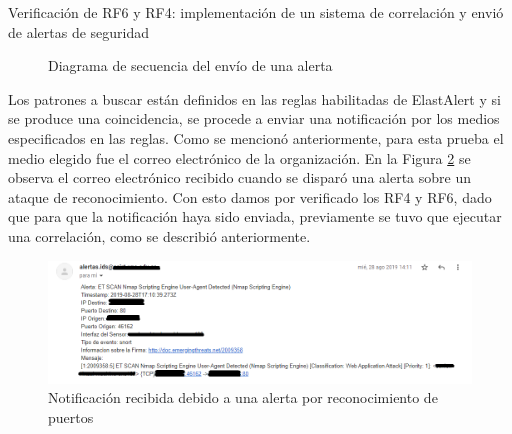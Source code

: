 \begin{section}{Verificación de RF6 y RF4: implementación de un sistema de correlación y envió de alertas de seguridad}
\begin{figure}[H]
        \caption{Diagrama de secuencia del envío de una alerta}
        \label{fig:iter2_diagrama_envio_alertas}
    \end{figure}
    Los patrones a buscar están definidos en las reglas habilitadas de ElastAlert y si se produce una coincidencia, se procede a enviar una notificación por los medios especificados en las reglas. Como se mencionó anteriormente, para esta prueba el medio elegido fue el correo electrónico de la organización. En la Figura \ref{fig:iter2_notificacion_alertas} se observa el correo electrónico recibido cuando se disparó una alerta sobre un ataque de reconocimiento. Con esto damos por verificado los RF4 y RF6, dado que para que la notificación haya sido enviada, previamente se tuvo que ejecutar una correlación, como se describió anteriormente.\par
    \begin{figure}[H]
    \centering
        \includegraphics[width=1\textwidth]{./iteracion_2_imagenes/notificacion_alertas_1EDITADO.png}
        \caption{Notificación recibida debido a una alerta por reconocimiento de puertos}
        \label{fig:iter2_notificacion_alertas}
    \end{figure}
    
    \end{section}